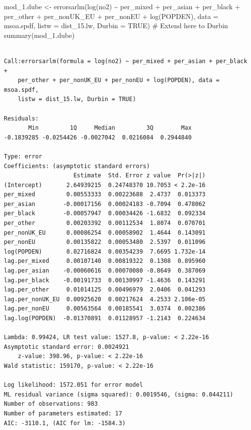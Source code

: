 \documentclass[
  letterpaper,
]{scrbook}
\newenvironment{Shaded}{\begin{snugshade}}{\end{snugshade}}
\newcommand{\AttributeTok}[1]{\textcolor[rgb]{0.40,0.45,0.13}{#1}}
\newcommand{\CommentTok}[1]{\textcolor[rgb]{0.37,0.37,0.37}{#1}}
\newcommand{\ConstantTok}[1]{\textcolor[rgb]{0.56,0.35,0.01}{#1}}
\newcommand{\FunctionTok}[1]{\textcolor[rgb]{0.28,0.35,0.67}{#1}}
\newcommand{\NormalTok}[1]{\textcolor[rgb]{0.00,0.23,0.31}{#1}}
\newcommand{\OtherTok}[1]{\textcolor[rgb]{0.00,0.23,0.31}{#1}}
\newcommand{\SpecialCharTok}[1]{\textcolor[rgb]{0.37,0.37,0.37}{#1}}
\begin{document}
\begin{Shaded}
\begin{Highlighting}[]
\NormalTok{mod\_1.dube }\OtherTok{\textless{}{-}} \FunctionTok{errorsarlm}\NormalTok{(}\FunctionTok{log}\NormalTok{(no2) }\SpecialCharTok{\textasciitilde{}}\NormalTok{ per\_mixed }\SpecialCharTok{+}\NormalTok{ per\_asian }\SpecialCharTok{+}\NormalTok{ per\_black }\SpecialCharTok{+}\NormalTok{ per\_other}
                      \SpecialCharTok{+}\NormalTok{ per\_nonUK\_EU }\SpecialCharTok{+}\NormalTok{ per\_nonEU  }\SpecialCharTok{+} \FunctionTok{log}\NormalTok{(POPDEN),  }
                      \AttributeTok{data =}\NormalTok{ msoa.spdf, }
                      \AttributeTok{listw =}\NormalTok{ dist\_15.lw,}
                      \AttributeTok{Durbin =} \ConstantTok{TRUE}\NormalTok{) }\CommentTok{\# Extend here to Durbin}
\FunctionTok{summary}\NormalTok{(mod\_1.dube)}
\end{Highlighting}
\end{Shaded}

\begin{verbatim}

Call:errorsarlm(formula = log(no2) ~ per_mixed + per_asian + per_black + 
    per_other + per_nonUK_EU + per_nonEU + log(POPDEN), data = msoa.spdf, 
    listw = dist_15.lw, Durbin = TRUE)

Residuals:
       Min         1Q     Median         3Q        Max 
-0.1839285 -0.0254426 -0.0027042  0.0216084  0.2944840 

Type: error 
Coefficients: (asymptotic standard errors) 
                    Estimate  Std. Error z value  Pr(>|z|)
(Intercept)       2.64939215  0.24748370 10.7053 < 2.2e-16
per_mixed         0.00553333  0.00223688  2.4737  0.013373
per_asian        -0.00017156  0.00024183 -0.7094  0.478062
per_black        -0.00057947  0.00034426 -1.6832  0.092334
per_other         0.00203392  0.00112534  1.8074  0.070701
per_nonUK_EU      0.00086254  0.00058902  1.4644  0.143091
per_nonEU         0.00135822  0.00053480  2.5397  0.011096
log(POPDEN)       0.02716824  0.00354239  7.6695 1.732e-14
lag.per_mixed     0.00107140  0.00819322  0.1308  0.895960
lag.per_asian    -0.00060616  0.00070080 -0.8649  0.387069
lag.per_black    -0.00191733  0.00130997 -1.4636  0.143291
lag.per_other     0.01014125  0.00496979  2.0406  0.041293
lag.per_nonUK_EU  0.00925620  0.00217624  4.2533 2.106e-05
lag.per_nonEU     0.00563564  0.00185541  3.0374  0.002386
lag.log(POPDEN)  -0.01370891  0.01128957 -1.2143  0.224634

Lambda: 0.99424, LR test value: 1527.8, p-value: < 2.22e-16
Asymptotic standard error: 0.0024921
    z-value: 398.96, p-value: < 2.22e-16
Wald statistic: 159170, p-value: < 2.22e-16

Log likelihood: 1572.051 for error model
ML residual variance (sigma squared): 0.0019546, (sigma: 0.044211)
Number of observations: 983 
Number of parameters estimated: 17 
AIC: -3110.1, (AIC for lm: -1584.3)
\end{verbatim}
\end{document}

